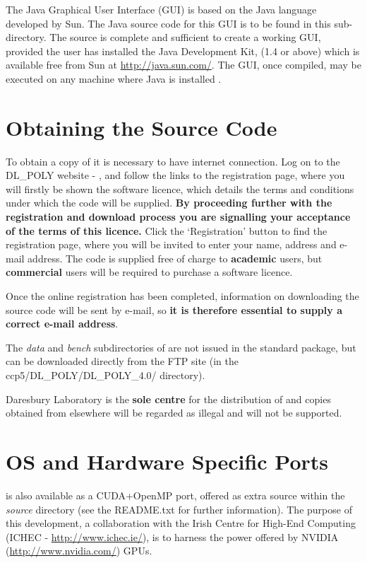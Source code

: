 The \D Java Graphical User Interface (GUI) is based on
the Java language developed by Sun.  The Java source code for this
GUI is to be found in this sub-directory.  The source is complete
and sufficient to create a working GUI, provided the user has installed
the Java Development Kit, (1.4 or above) which is available free
from Sun at \href{http://java.sun.com/}{http://java.sun.com/}.
The GUI, once compiled, may be executed on any machine where Java
is installed \cite{smith-gui}.

\section{Obtaining the Source Code}\label{source}  

To obtain a copy of \D it is necessary to have internet connection.
Log on to the DL\_POLY website - \WEB{},
and follow the links to the \D registration page, where you will
firstly be shown the \D software licence, which details the
terms and conditions under which the code will be supplied.  {\bf By
proceeding further with the registration and download process you
are signalling your acceptance of the terms of this licence.}  Click
the `Registration' button to find the registration page, where you
will be invited to enter your name, address and e-mail address.  The
code is supplied free of charge to {\bf academic} users, but
{\bf commercial} users will be required to purchase a software licence.

Once the online registration has been completed, information
on downloading the \D source code will be sent by e-mail, so {\bf
it is therefore essential to supply a correct e-mail address}.

The {\em data} and {\em bench} subdirectories of \D are not issued
in the standard package, but can be downloaded directly from the
FTP site (in the \mbox{ccp5/DL\_POLY/DL\_POLY\_4.0/} directory).

 Daresbury Laboratory is the {\bf sole centre} for
the distribution of \D and copies obtained from elsewhere will be
regarded as illegal and will not be supported.

\section{OS and Hardware Specific Ports}
%
%
\D is also available as a CUDA+OpenMP port, offered as extra
source within the {\em source} directory (see the README.txt
for further information).  The purpose of this development,
a collaboration with the Irish Centre for High-End Computing
(ICHEC - \href{http://www.ichec.ie/}{http://www.ichec.ie/}),
is to harness the power offered by NVIDIA\textregistered
(\href{http://www.nvidia.com/}{http://www.nvidia.com/}) GPUs.

